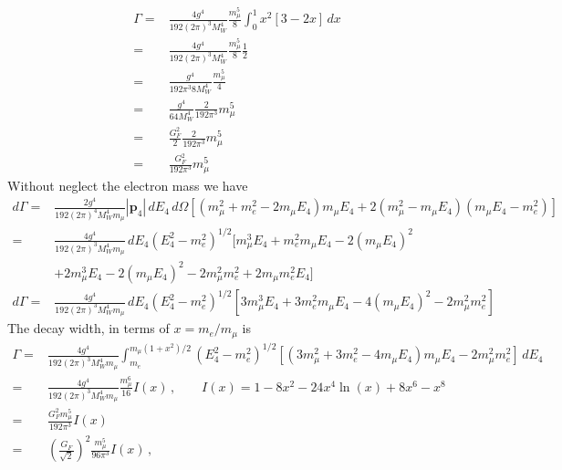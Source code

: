 \begin{align}
  \Gamma=&\frac{4g^4}{192 (2\pi)^3 M_W^4 }\frac{m_\mu^5}{8}\int_0^1x^2[3-2x]\,d x\nonumber\\
  =&\frac{4g^4}{192 (2\pi)^3 M_W^4 }\frac{m_\mu^5}{8}\frac{1}{2}\nonumber\\
  =&\frac{g^4}{192 \pi^3 8M_W^4 }\frac{m_\mu^5}{4}\nonumber\\
  =&\frac{g^4}{64 M_W^4 }\frac{2}{192 \pi^3}m_\mu^5\nonumber\\
  =&\frac{G_F^2}{2}\frac{2}{192 \pi^3}m_\mu^5\nonumber\\
  =&\frac{G_F^2}{192 \pi^3}m_\mu^5
\end{align}
Without neglect the electron mass we have
\begin{align}
  d\Gamma=&\frac{2g^4}{192 (2\pi)^4 M_W^4 m_\mu }|\mathbf{p}_4|\,d E_4\,d\Omega[(m_\mu^2+m_e^2-2m_\mu E_4)m_\mu E_4 
  +2(m_\mu^2-m_\mu E_4)(m_\mu E_4-m_e^2)]\nonumber\\
  =&\frac{4g^4}{192 (2\pi)^3 M_W^4 m_\mu }\,d E_4(E_4^2-m_e^2)^{1/2}[m_\mu^3 E_4+m_e^2m_\mu E_4-2(m_\mu E_4)^2 \nonumber\\
  &+2m_\mu^3 E_4-2(m_\mu E_4)^2-2m_\mu^2m_e^2+2m_\mu m_e^2 E_4]\nonumber\\
 d\Gamma =&\frac{4g^4}{192 (2\pi)^3 M_W^4 m_\mu }\,d E_4(E_4^2-m_e^2)^{1/2}[3m_\mu^3 E_4+3 m_e^2m_\mu E_4-4(m_\mu E_4)^2 
  -2m_\mu^2m_e^2]
\end{align}
The decay width, in terms of $x=m_e/m_\mu$ is
\begin{align}
  \label{eq:120}
 \Gamma =&\frac{4g^4}{192 (2\pi)^3 M_W^4 m_\mu }\int_{m_e}^{m_\mu(1+x^2)/2}(E_4^2-m_e^2)^{1/2}[(3m_\mu^2+3 m_e^2-4m_\mu E_4)m_\mu E_4
  -2m_\mu^2m_e^2]\,d E_4\nonumber\\
=&\frac{4g^4}{192 (2\pi)^3 M_W^4 m_\mu }\frac{m_\mu^6}{16}I\left(x\right)\,,\qquad I(x)=1-8x^2-24x^4\ln(x)+8x^6-x^8\nonumber\\
 =&\frac{G_F^2 m_\mu^5}{192\pi^3}I\left(x\right)\nonumber\\
=&\left(\frac{G_F}{\sqrt{2}}\right)^2\frac{m_\mu^5}{96\pi^3}I\left(x\right)\,,
\end{align}

